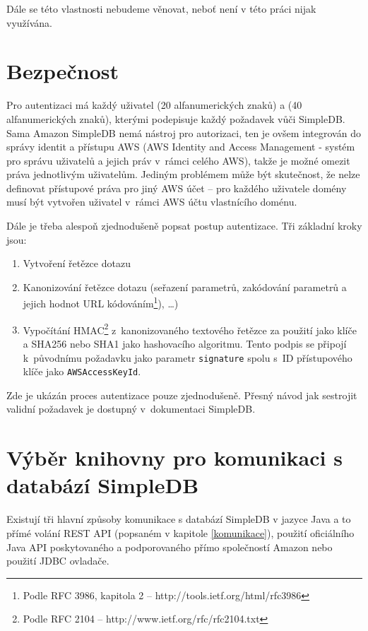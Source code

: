\documentclass[oneside,12pt]{fithesis2}
\begin{document}
Dále se této vlastnosti nebudeme věnovat, neboť není v této práci nijak využívána.

\section{Bezpečnost}
Pro autentizaci má každý uživatel  (20 alfanumerických znaků) a  (40 alfanumerických znaků), kterými podepisuje každý požadavek vůči SimpleDB. Sama Amazon SimpleDB nemá nástroj pro autorizaci, ten je ovšem integrován do správy identit a přístupu AWS (AWS Identity and Access Management - systém pro správu uživatelů a jejich práv v~rámci celého AWS), takže je možné omezit práva jednotlivým uživatelům. Jediným problémem může být skutečnost, že nelze definovat přístupové práva pro jiný AWS účet -- pro každého uživatele domény musí být vytvořen uživatel v~rámci AWS účtu vlastnícího doménu\cite{simpledb}.

Dále je třeba alespoň zjednodušeně popsat postup autentizace. Tři základní kroky jsou:
\begin{enumerate}
 \item Vytvoření řetězce dotazu
 \item Kanonizování řetězce dotazu (seřazení parametrů, zakódování parametrů a jejich hodnot URL kódováním\footnote{Podle RFC 3986, kapitola 2 -- http://tools.ietf.org/html/rfc3986}), \dots)
 \item Vypočítání HMAC\footnote{Podle RFC 2104 -- http://www.ietf.org/rfc/rfc2104.txt} z~kanonizovaného textového řetězce za použití  jako klíče a SHA256 nebo SHA1 jako hashovacího algoritmu. Tento podpis se připojí k~původnímu požadavku jako parametr \verb<signature< spolu s~ID přístupového klíče jako \verb<AWSAccessKeyId<.
\end{enumerate}
Zde je ukázán proces autentizace pouze zjednodušeně. Přesný návod jak sestrojit validní požadavek je dostupný v~dokumentaci SimpleDB\cite[strana 24, Authentication Process]{simpledbDeveloper}.

\section{Výběr knihovny pro komunikaci s databází SimpleDB}
Existují tři hlavní způsoby komunikace s databází SimpleDB v jazyce Java a to přímé volání REST API (popsaném v kapitole \ref{komunikace}), použití oficiálního Java API poskytovaného a podporovaného přímo společností Amazon nebo použití JDBC ovladače.
\end{document}
